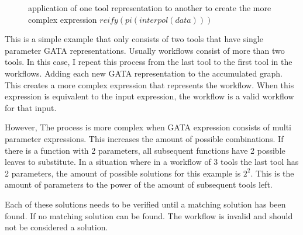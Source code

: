 \documentclass{article}
\begin{document}
\begin{figure}[H]
    \centering
   
    
    \caption{application of one tool representation to another to create the more complex expression   $reify(pi(interpol(data)))$}
  \label{fig:combineGATA}
\end{figure}

This is a simple example that only consists of two tools that have single parameter GATA representations. Usually workflows consist of more than two tools. In this case, I repeat this process from the last tool to the first tool in the workflows. Adding each new GATA representation to the accumulated graph. This creates a more complex expression that represents the workflow. When this expression is equivalent to the input expression, the workflow is a valid workflow for that input. 

However, The process is more complex when GATA expression consists of multi parameter expressions. This increases the amount of possible combinations. If there is a function with 2 parameters, all subsequent functions have 2 possible leaves to substitute. In a situation where in a workflow of 3 tools the last tool has 2 parameters, the amount of possible solutions for this example is $2^2$. This is the amount of parameters to the power of the amount of subsequent tools left.

Each of these solutions needs to be verified until a matching solution has been found. If no matching solution can be found. The workflow is invalid and should not be considered a solution.
\end{document}
